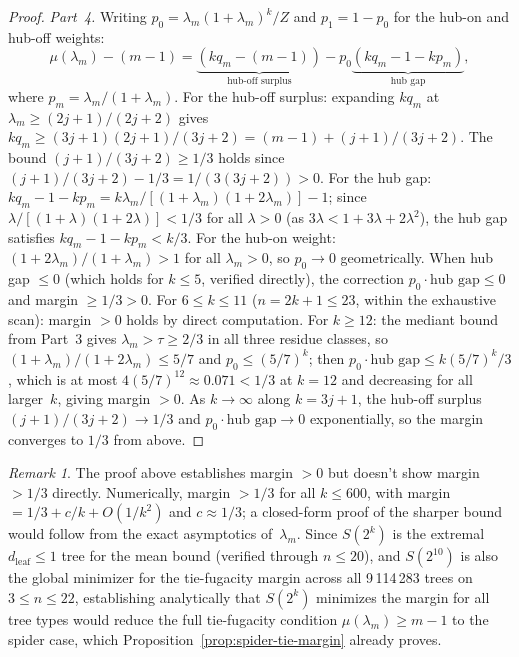 \documentclass[12pt,oneside]{article}
\theoremstyle{remark}
\newtheorem{remark}[theorem]{Remark}
\newcommand{\dleaf}{d_{\mathrm{leaf}}}    %
\begin{document}
\begin{proof}
\textit{Part~4.}
Writing $p_0 = \lambda_m(1+\lambda_m)^k/Z$ and $p_1 = 1-p_0$ for the hub-on and hub-off weights:
\[
  \mu(\lambda_m) - (m-1)
  = \underbrace{(kq_m - (m-1))}_{\text{hub-off surplus}}
  - p_0\underbrace{(kq_m - 1 - kp_m)}_{\text{hub gap}},
\]
where $p_m = \lambda_m/(1+\lambda_m)$.
For the hub-off surplus: expanding $kq_m$ at $\lambda_m \ge (2j+1)/(2j+2)$ gives $kq_m \ge (3j+1)(2j+1)/(3j+2) = (m-1) + (j+1)/(3j+2)$.
The bound $(j+1)/(3j+2) \ge 1/3$ holds since $(j+1)/(3j+2) - 1/3 = 1/(3(3j+2)) > 0$.
For the hub gap: $kq_m - 1 - kp_m = k\lambda_m/[(1+\lambda_m)(1+2\lambda_m)] - 1$; since $\lambda/[(1+\lambda)(1+2\lambda)] < 1/3$ for all $\lambda > 0$ (as $3\lambda < 1 + 3\lambda + 2\lambda^2$), the hub gap satisfies $kq_m - 1 - kp_m < k/3$.
For the hub-on weight: $(1+2\lambda_m)/(1+\lambda_m) > 1$ for all $\lambda_m > 0$, so $p_0 \to 0$ geometrically.
When hub gap $\le 0$ (which holds for $k \le 5$, verified directly), the correction $p_0 \cdot \text{hub gap} \le 0$ and margin $\ge 1/3 > 0$.
For $6 \le k \le 11$ ($n = 2k+1 \le 23$, within the exhaustive scan): margin $> 0$ holds by direct computation.
For $k \ge 12$: the mediant bound from Part~3 gives $\lambda_m > \tau \ge 2/3$ in all three residue classes, so $(1+\lambda_m)/(1+2\lambda_m) \le 5/7$ and $p_0 \le (5/7)^k$; then $p_0 \cdot \text{hub gap} \le k(5/7)^k/3$, which is at most $4(5/7)^{12} \approx 0.071 < 1/3$ at $k = 12$ and decreasing for all larger~$k$, giving margin $> 0$.
As $k \to \infty$ along $k = 3j+1$, the hub-off surplus $(j+1)/(3j+2) \to 1/3$ and $p_0 \cdot \text{hub gap} \to 0$ exponentially, so the margin converges to $1/3$ from above.
\end{proof}

\begin{remark}
The proof above establishes margin $> 0$ but doesn't show margin $> 1/3$ directly.
Numerically, margin $> 1/3$ for all $k \le 600$, with margin $= 1/3 + c/k + O(1/k^2)$ and $c \approx 1/3$; a closed-form proof of the sharper bound would follow from the exact asymptotics of~$\lambda_m$.
Since $S(2^k)$ is the extremal $\dleaf \le 1$ tree for the mean bound (verified through $n \le 20$), and $S(2^{10})$ is also the global minimizer for the tie-fugacity margin across all 9\,114\,283 trees on $3\le n\le22$, establishing analytically that $S(2^k)$ minimizes the margin for all tree types would reduce the full tie-fugacity condition $\mu(\lambda_m) \ge m-1$ to the spider case, which Proposition~\ref{prop:spider-tie-margin} already proves.
\end{remark}
\end{document}
